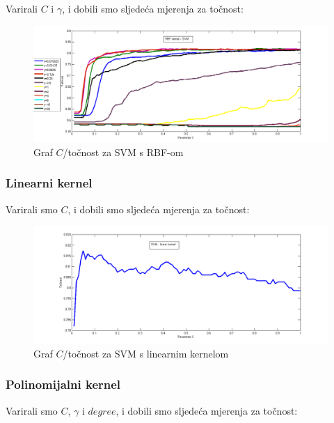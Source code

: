 \documentclass[conference]{IEEEtran}
\begin{document}
Varirali $C$ i $\gamma$, i dobili smo sljedeća mjerenja za točnost:

\begin{figure}[H]
\begin{minipage}{0.5\textwidth}
\centering
\includegraphics[width=\textwidth]{images/allRBF.png}
\caption{Graf $C$/točnost za SVM s RBF-om}
\end{minipage}
\end{figure}

\subsubsection{Linearni kernel}

Varirali smo $C$, i dobili smo sljedeća mjerenja za točnost:

\begin{figure}[H]
\begin{minipage}{0.5\textwidth}
\centering
\includegraphics[width=\textwidth]{images/paraCLinear.png}
\caption{Graf $C$/točnost za SVM s linearnim kernelom}
\end{minipage}
\end{figure}

\subsubsection{Polinomijalni kernel}

Varirali smo $C$, $\gamma$ i $degree$, i dobili smo sljedeća mjerenja za točnost:
\end{document}
